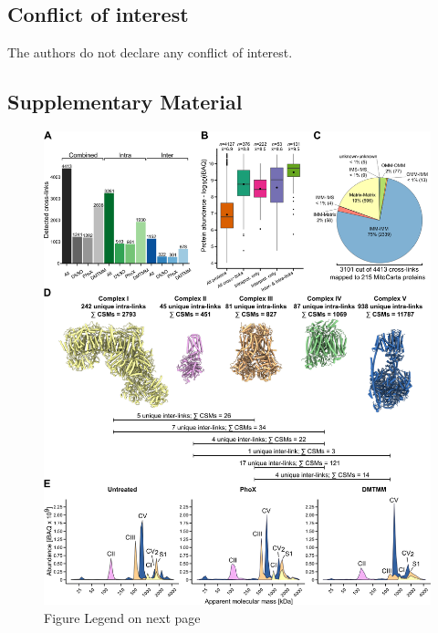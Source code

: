 \subsection*{Conflict of interest}
The authors do not declare any conflict of interest.
%
\clearpage
\begin{subappendices}
	\section{Supplementary Material}
	\begin{figure}[hb!]
		\center
		\includegraphics[]{Chapter.3/Figures/SI_Figure1.png}
		\caption{Figure Legend on next page}
		\label{fig:ch3_app_fig1}
	\end{figure}
	\addtocounter{figure}{-1}
	\begin{figure}[ht!]

\end{figure}
\end{subappendices}
